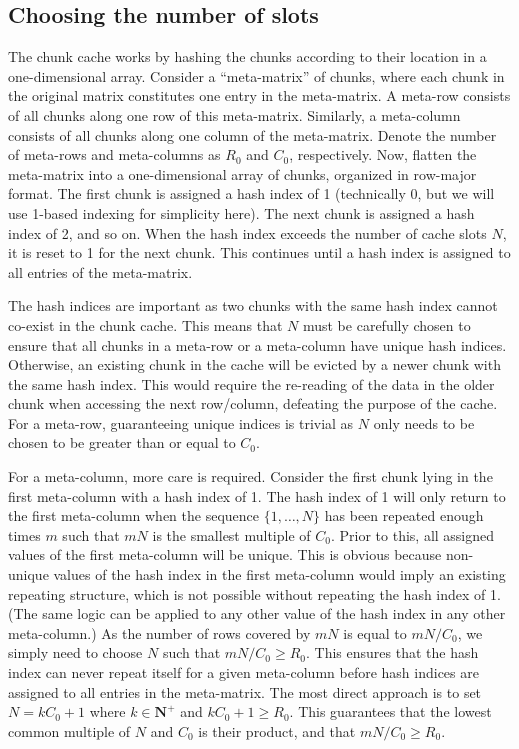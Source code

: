 \documentclass{article}
\begin{document}
\subsection{Choosing the number of slots}
The chunk cache works by hashing the chunks according to their location in a one-dimensional array.
Consider a ``meta-matrix'' of chunks, where each chunk in the original matrix constitutes one entry in the meta-matrix.
A meta-row consists of all chunks along one row of this meta-matrix.
Similarly, a meta-column consists of all chunks along one column of the meta-matrix. 
Denote the number of meta-rows and meta-columns as $R_0$ and $C_0$, respectively.
Now, flatten the meta-matrix into a one-dimensional array of chunks, organized in row-major format.
The first chunk is assigned a hash index of 1 (technically 0, but we will use 1-based indexing for simplicity here).
The next chunk is assigned a hash index of 2, and so on.
When the hash index exceeds the number of cache slots $N$, it is reset to 1 for the next chunk.
This continues until a hash index is assigned to all entries of the meta-matrix.

The hash indices are important as two chunks with the same hash index cannot co-exist in the chunk cache.
This means that $N$ must be carefully chosen to ensure that all chunks in a meta-row or a meta-column have unique hash indices.
Otherwise, an existing chunk in the cache will be evicted by a newer chunk with the same hash index.
This would require the re-reading of the data in the older chunk when accessing the next row/column, defeating the purpose of the cache.
For a meta-row, guaranteeing unique indices is trivial as $N$ only needs to be chosen to be greater than or equal to $C_0$.

For a meta-column, more care is required.
Consider the first chunk lying in the first meta-column with a hash index of 1.
The hash index of 1 will only return to the first meta-column when the sequence $\{1, \ldots, N\}$ has been repeated enough times $m$ such that $mN$ is the smallest multiple of $C_0$.
Prior to this, all assigned values of the first meta-column will be unique.
This is obvious because non-unique values of the hash index in the first meta-column would imply an existing repeating structure, which is not possible without repeating the hash index of 1.
(The same logic can be applied to any other value of the hash index in any other meta-column.)
As the number of rows covered by $mN$ is equal to $mN/C_0$, we simply need to choose $N$ such that $mN/C_0 \ge R_0$.
This ensures that the hash index can never repeat itself for a given meta-column before hash indices are assigned to all entries in the meta-matrix.
The most direct approach is to set $N = kC_0 + 1$  where $k \in \mathbf{N}^+$ and $kC_0 +1 \ge R_0$.
This guarantees that the lowest common multiple of $N$ and $C_0$ is their product, and that $mN/C_0 \ge R_0$.
\end{document}
